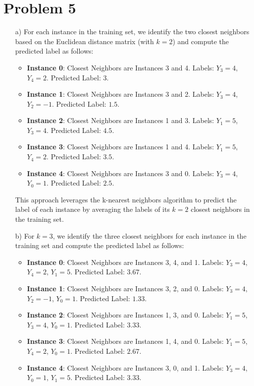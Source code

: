 \documentclass{article}
\begin{document}
\section*{Problem 5}
    \begin{itemize}
        \item [a)]
        For each instance in the training set, we identify the two closest neighbors based on the Euclidean distance matrix (with \(k=2\)) and compute the predicted label as follows:

\begin{itemize}
    \item \textbf{Instance 0}: Closest Neighbors are Instances 3 and 4. Labels: \(Y_3 = 4\), \(Y_4 = 2\). Predicted Label: \(3\).
    \item \textbf{Instance 1}: Closest Neighbors are Instances 3 and 2. Labels: \(Y_3 = 4\), \(Y_2 = -1\). Predicted Label: \(1.5\).
    \item \textbf{Instance 2}: Closest Neighbors are Instances 1 and 3. Labels: \(Y_1 = 5\), \(Y_3 = 4\). Predicted Label: \(4.5\).
    \item \textbf{Instance 3}: Closest Neighbors are Instances 1 and 4. Labels: \(Y_1 = 5\), \(Y_4 = 2\). Predicted Label: \(3.5\).
    \item \textbf{Instance 4}: Closest Neighbors are Instances 3 and 0. Labels: \(Y_3 = 4\), \(Y_0 = 1\). Predicted Label: \(2.5\).
\end{itemize}

This approach leverages the k-nearest neighbors algorithm to predict the label of each instance by averaging the labels of its \(k=2\) closest neighbors in the training set.

    \item[b)]
    For \(k=3\), we identify the three closest neighbors for each instance in the training set and compute the predicted label as follows:

\begin{itemize}
    \item \textbf{Instance 0}: Closest Neighbors are Instances 3, 4, and 1. Labels: \(Y_3 = 4\), \(Y_4 = 2\), \(Y_1 = 5\). Predicted Label: \(3.67\).
    \item \textbf{Instance 1}: Closest Neighbors are Instances 3, 2, and 0. Labels: \(Y_3 = 4\), \(Y_2 = -1\), \(Y_0 = 1\). Predicted Label: \(1.33\).
    \item \textbf{Instance 2}: Closest Neighbors are Instances 1, 3, and 0. Labels: \(Y_1 = 5\), \(Y_3 = 4\), \(Y_0 = 1\). Predicted Label: \(3.33\).
    \item \textbf{Instance 3}: Closest Neighbors are Instances 1, 4, and 0. Labels: \(Y_1 = 5\), \(Y_4 = 2\), \(Y_0 = 1\). Predicted Label: \(2.67\).
    \item \textbf{Instance 4}: Closest Neighbors are Instances 3, 0, and 1. Labels: \(Y_3 = 4\), \(Y_0 = 1\), \(Y_1 = 5\). Predicted Label: \(3.33\).
\end{itemize}


\end{itemize}
\end{document}
